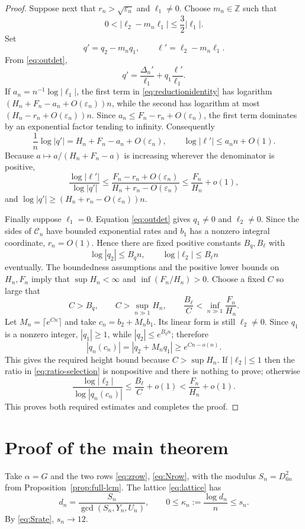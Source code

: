 \documentclass[11pt]{article}
\theoremstyle{definition}
\theoremstyle{remark}
\newcommand{\Z}{\mathbb Z}
\begin{document}
\begin{proof}
Suppose next that $r_n>\sqrt{\varepsilon_n}$ and $\ell_1\ne0$.  Choose $m_n\in\Z$ such that
\[
0<|\ell_2-m_n\ell_1|\le\frac32|\ell_1|.
\]
Set
\[
q'=q_2-m_nq_1,\qquad \ell'=\ell_2-m_n\ell_1.
\]
From \eqref{eq:outdet},
\begin{equation}\label{eq:reductionidentity}
q'=\frac{\Delta_n'}{\ell_1}+q_1\frac{\ell'}{\ell_1}.
\end{equation}
If $a_n=n^{-1}\log|\ell_1|$, the first term in \eqref{eq:reductionidentity} has logarithm
$(H_n+F_n-a_n+O(\varepsilon_n))n$, while the second has logarithm at most
$(H_n-r_n+O(\varepsilon_n))n$.  Since
$a_n\le F_n-r_n+O(\varepsilon_n)$, the first term dominates by an exponential factor tending to infinity.  Consequently
\[
\frac1n\log|q'|=H_n+F_n-a_n+O(\varepsilon_n),
\qquad \log|\ell'|\le a_nn+O(1).
\]
Because $a\mapsto a/(H_n+F_n-a)$ is increasing wherever the denominator is positive,
\[
\frac{\log|\ell'|}{\log|q'|}
\le
\frac{F_n-r_n+O(\varepsilon_n)}{H_n+r_n-O(\varepsilon_n)}
\le\frac{F_n}{H_n}+o(1),
\]
and $\log|q'|\ge(H_n+r_n-O(\varepsilon_n))n$.

Finally suppose $\ell_1=0$.  Equation \eqref{eq:outdet} gives $q_1\ne0$ and $\ell_2\ne0$.  Since the sides of $\mathcal C_n$ have bounded exponential rates and $b_1$ has a nonzero integral coordinate, $r_n=O(1)$.  Hence there are fixed positive constants $B_q,B_\ell$ with
\[
\log|q_2|\le B_qn,
\qquad \log|\ell_2|\le B_\ell n
\]
eventually.  The boundedness assumptions and the positive lower bounds on $H_n,F_n$ imply that $\sup H_n<\infty$ and $\inf(F_n/H_n)>0$.  Choose a fixed $C$ so large that
\[
C>B_q,\qquad C>\sup_{n\gg1}H_n,
\qquad \frac{B_\ell}{C}<\inf_{n\gg1}\frac{F_n}{H_n}.
\]
Let $M_n=\lceil e^{Cn}\rceil$ and take $c_n=b_2+M_nb_1$.  Its linear form is still $\ell_2\ne0$.  Since $q_1$ is a nonzero integer, $|q_1|\ge1$, while $|q_2|\le e^{B_qn}$; therefore
\[
|q_n(c_n)|=|q_2+M_nq_1|\ge e^{Cn-o(n)}.
\]
This gives the required height bound because $C>\sup H_n$.  If $|\ell_2|\le1$ then the ratio in \eqref{eq:ratio-selection} is nonpositive and there is nothing to prove; otherwise
\[
\frac{\log|\ell_2|}{\log|q_n(c_n)|}
\le \frac{B_\ell}{C}+o(1)
<\frac{F_n}{H_n}+o(1).
\]
This proves both required estimates and completes the proof.
\end{proof}

\section{Proof of the main theorem}
Take $\alpha=G$ and the two rows \eqref{eq:zrow}, \eqref{eq:Nrow}, with the modulus $S_n=D_{6n}^2$ from Proposition~\ref{prop:full-lcm}.  The lattice \eqref{eq:lattice} has
\[
d_n=\frac{S_n}{\gcd(S_n,Y_n,U_n)},
\qquad 0\le\kappa_n:=\frac{\log d_n}{n}\le s_n.
\]
By \eqref{eq:Srate}, $s_n\to12$.
\end{document}
